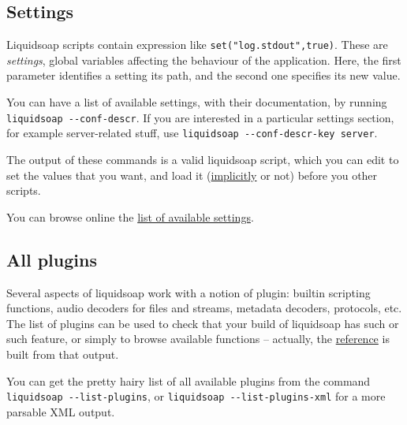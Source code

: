 \subsection{Settings}
Liquidsoap scripts contain expression like \verb+set("log.stdout",true)+.
These are \emph{settings}, global variables affecting the behaviour of the 
application.
Here, the first parameter identifies a setting its path,
and the second one specifies its new value.

You can have a list of available settings, with their documentation,
by running \verb+liquidsoap --conf-descr+.
If you are interested in a particular settings section,
for example server-related stuff, use \verb+liquidsoap --conf-descr-key server+.

The output of these commands is a valid liquidsoap script,
which you can edit to set the values that you want,
and load it (\href{script_loading.html}{implicitly} or not) before you other scripts.

You can browse online the \href{settings.html}{list of available settings}.

\subsection{All plugins}
Several aspects of liquidsoap work with a notion of plugin: builtin scripting 
functions, audio decoders for files and streams, metadata decoders, protocols, 
etc. The list of plugins can be used to check that your build of 
liquidsoap has such or such feature, or simply to browse available functions 
-- actually, the \href{reference.html}{reference} is built from that output.

You can get the pretty hairy list of all available plugins from the 
command \verb+liquidsoap --list-plugins+, or \verb+liquidsoap --list-plugins-xml+ for a 
more parsable XML output.

